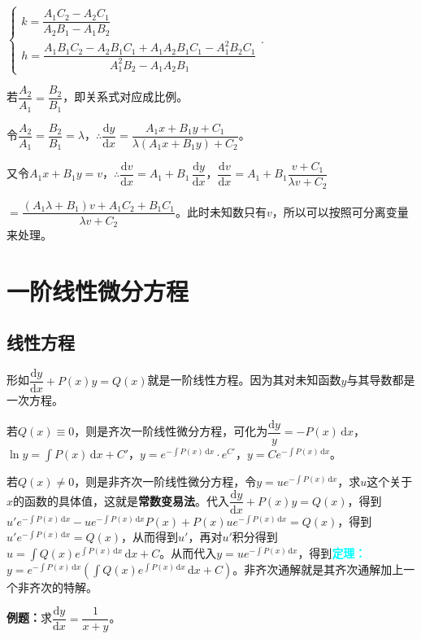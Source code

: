 \documentclass[UTF8, 12pt]{ctexart}
\begin{document}
$\left\{\begin{array}{l}
    k=\dfrac{A_1C_2-A_2C_1}{A_2B_1-A_1B_2} \\  
    h=\dfrac{A_1B_1C_2-A_2B_1C_1+A_1A_2B_1C_1-A_1^2B_2C_1}{A_1^2B_2-A_1A_2B_1}
\end{array}
\right.$.

若$\dfrac{A_2}{A_1}=\dfrac{B_2}{B_1}$，即关系式对应成比例。

令$\dfrac{A_2}{A_1}=\dfrac{B_2}{B_1}=\lambda$，$\therefore\dfrac{\textrm{d}y}{\textrm{d}x}=\dfrac{A_1x+B_1y+C_1}{\lambda(A_1x+B_1y)+C_2}$。

又令$A_1x+B_1y=v$，$\therefore\dfrac{\textrm{d}v}{\textrm{d}x}=A_1+B_1\,\dfrac{\textrm{d}y}{\textrm{d}x}$，$\dfrac{\textrm{d}v}{\textrm{d}x}=A_1+B_1\dfrac{v+C_1}{\lambda v+C_2}$

$=\dfrac{(A_1\lambda+B_1)v+A_1C_2+B_1C_1}{\lambda v+C_2}$。此时未知数只有$v$，所以可以按照可分离变量来处理。

\section{一阶线性微分方程}

\subsection{线性方程}

形如$\dfrac{\textrm{d}y}{\textrm{d}x}+P(x)y=Q(x)$就是一阶线性方程。因为其对未知函数$y$与其导数都是一次方程。

若$Q(x)\equiv 0$，则是齐次一阶线性微分方程，可化为$\dfrac{\textrm{d}y}{y}=-P(x)\,\textrm{d}x$，$\ln y=\int P(x)\,\textrm{d}x+C'$，$y=e^{-\int P(x)\,\textrm{d}x}\cdot e^{C'}$，$y=Ce^{-\int P(x)\,\textrm{d}x}$。

若$Q(x)\neq 0$，则是非齐次一阶线性微分方程，令$y=ue^{-\int P(x)\,\textrm{d}x}$，求$u$这个关于$x$的函数的具体值，这就是\textbf{常数变易法}。代入$\dfrac{\textrm{d}y}{\textrm{d}x}+P(x)y=Q(x)$，得到$u'e^{-\int P(x)\,\textrm{d}x}-ue^{-\int P(x)\,\textrm{d}x}P(x)+P(x)ue^{-\int P(x)\,\textrm{d}x}=Q(x)$，得到$u'e^{-\int P(x)\,\textrm{d}x}=Q(x)$，从而得到$u'$，再对$u'$积分得到$u=\displaystyle{\int Q(x)e^{\int P(x)\,\textrm{d}x}\,\textrm{d}x}+C$。从而代入$y=ue^{-\int P(x)\,\textrm{d}x}$，得到\textcolor{aqua}{\textbf{定理：}}$y=e^{-\int P(x)\,\textrm{d}x}(\int Q(x)e^{\int P(x)\,\textrm{d}x}\,\textrm{d}x+C)$。非齐次通解就是其齐次通解加上一个非齐次的特解。

\textbf{例题：}求$\dfrac{\textrm{d}y}{\textrm{d}x}=\dfrac{1}{x+y}$。
\end{document}
